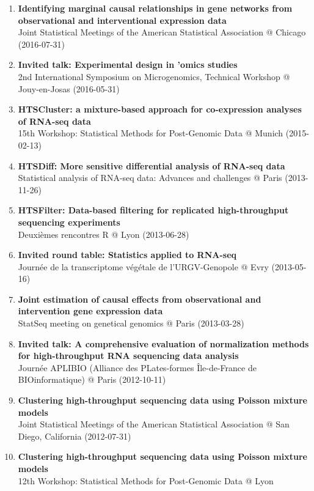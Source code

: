\documentclass[11pt, a4paper]{awesome-cv}
\begin{document}
\begin{enumerate}
\item
  \textbf{Identifying marginal causal relationships in gene networks
  from observational and interventional expression data}\\
  Joint Statistical Meetings of the American Statistical Association @
  Chicago (2016-07-31)
\item
  \textbf{Invited talk: Experimental design in 'omics studies}\\
  2nd International Symposium on Microgenomics, Technical Workshop @
  Jouy-en-Josas (2016-05-31)
\item
  \textbf{HTSCluster: a mixture-based approach for co-expression
  analyses of RNA-seq data}\\
  15th Workshop: Statistical Methods for Post-Genomic Data @ Munich
  (2015-02-13)
\item
  \textbf{HTSDiff: More sensitive differential analysis of RNA-seq
  data}\\
  Statistical analysis of RNA-seq data: Advances and challenges @ Paris
  (2013-11-26)
\item
  \textbf{HTSFilter: Data-based filtering for replicated high-throughput
  sequencing experiments}\\
  Deuxièmes rencontres R @ Lyon (2013-06-28)
\item
  \textbf{Invited round table: Statistics applied to RNA-seq}\\
  Journée de la transcriptome végétale de l'URGV-Genopole @ Evry
  (2013-05-16)
\item
  \textbf{Joint estimation of causal effects from observational and
  intervention gene expression data}\\
  StatSeq meeting on genetical genomics @ Paris (2013-03-28)
\item
  \textbf{Invited talk: A comprehensive evaluation of normalization
  methods for high-throughput RNA sequencing data analysis}\\
  Journée APLIBIO (Alliance des PLates-formes Île-de-France de
  BIOinformatique) @ Paris (2012-10-11)
\item
  \textbf{Clustering high-throughput sequencing data using Poisson
  mixture models}\\
  Joint Statistical Meetings of the American Statistical Association @
  San Diego, California (2012-07-31)
\item
  \textbf{Clustering high-throughput sequencing data using Poisson
  mixture models}\\
  12th Workshop: Statistical Methods for Post-Genomic Data @ Lyon

\end{enumerate}
\end{document}
